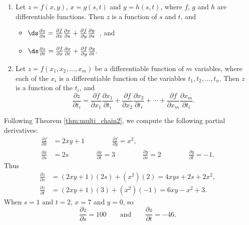 {\begin{enumerate}
	\item Let $z=f(x,y)$, $x=g(s,t)$ and $y=h(s,t)$, where $f$, $g$ and $h$ are differentiable functions. Then $z$ is a function of $s$ and $t$, and
		\begin{itemize}
			\item $\ds \frac{\partial z}{\partial s} = \frac{\partial f}{\partial x}\frac{\partial x}{\partial s} + \frac{\partial f}{\partial y}\frac{\partial y}{\partial s}$\ , \quad and 
			\item $\ds \frac{\partial z}{\partial t} = \frac{\partial f}{\partial x}\frac{\partial x}{\partial t} + \frac{\partial f}{\partial y}\frac{\partial y}{\partial t}.$
		\end{itemize}
		
		\item		Let $z = f(x_1,x_2,\ldots,x_m)$ be a differentiable function of $m$ variables, where each of the $x_i$ is a differentiable function of the variables $t_1,t_2,\ldots,t_n$. Then $z$ is a function of the $t_i$, and 
		\[
		\frac{\partial z}{\partial t_i} = \frac{\partial f}{\partial x_1}\frac{\partial x_1}{\partial t_i} + \frac{\partial f}{\partial x_2}\frac{\partial x_2}{\partial t_i} + \cdots +  \frac{\partial f}{\partial x_m}\frac{\partial x_m}{\partial t_i}.
		\]
\end{enumerate}
}

{Following Theorem \ref{thm:multi_chain2}, we compute the following partial derivatives:
\begin{align*}
\frac{\partial f}{\partial x} &= 2xy+1\qquad\qquad \frac{\partial f}{\partial y} = x^2,\\
\frac{\partial x}{\partial s} &= 2s \qquad\qquad \frac{\partial x}{\partial t} = 3\qquad\qquad \frac{\partial y}{\partial s} = 2 \qquad\qquad \frac{\partial y}{\partial t} = -1.
\end{align*}
Thus 
\begin{align*}
 \frac{\partial z}{\partial s} &= (2xy+1)(2s) + (x^2)(2) = 4xys+2s + 2x^2, \tag*{and}\\
 \frac{\partial z}{\partial t} &= (2xy+1)(3) + (x^2)(-1) = 6xy-x^2+3.
\end{align*}
When $s=1$ and $t=2$, $x= 7$ and $y= 0$, so 
\[
\frac{\partial z}{\partial s} = 100\qquad \text{and}\qquad \frac{\partial z}{\partial t} = -46.
\]
\baselineskip}\\

